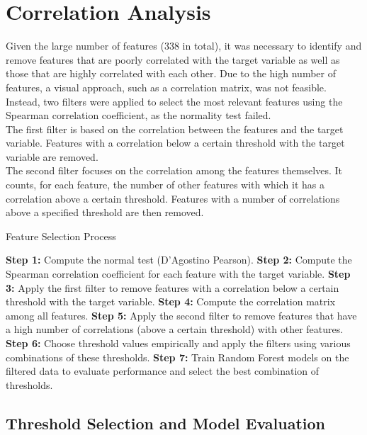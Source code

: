 \section{Correlation Analysis}

Given the large number of features (338 in total), it was necessary to identify and remove features that are poorly correlated with
the target variable as well as those that are highly correlated with each other. Due to the high number of features, a visual approach,
such as a correlation matrix, was not feasible. Instead, two filters were applied to select the most
relevant features using the Spearman correlation coefficient, as the normality test failed.\\
The first filter is based on the correlation between the features and the target variable. Features with a correlation below a certain
threshold with the target variable are removed.\\
The second filter focuses on the correlation among the features themselves.
It counts, for each feature, the number of other features with which it has a correlation above a certain threshold. Features with a
number of correlations above a specified threshold are then removed.\\

\begin{algorithm}
    \caption{Feature Selection Process}
    \begin{algorithmic}[1]
        \State \textbf{Step 1:} Compute  the normal test (D'Agostino Pearson).
        \State \textbf{Step 2:} Compute the Spearman correlation coefficient for each feature with the target variable.
        \State \textbf{Step 3:} Apply the first filter to remove features with a correlation below a certain threshold with the target variable.
        \State \textbf{Step 4:} Compute the correlation matrix among all features.
        \State \textbf{Step 5:} Apply the second filter to remove features that have a high number of correlations (above a certain threshold)
        with other features.
        \State \textbf{Step 6:} Choose threshold values empirically and apply the filters using various combinations of these thresholds.
        \State \textbf{Step 7:} Train Random Forest models on the filtered data to evaluate performance and select the best combination of thresholds.
    \end{algorithmic}
\end{algorithm}

\subsection{Threshold Selection and Model Evaluation}

